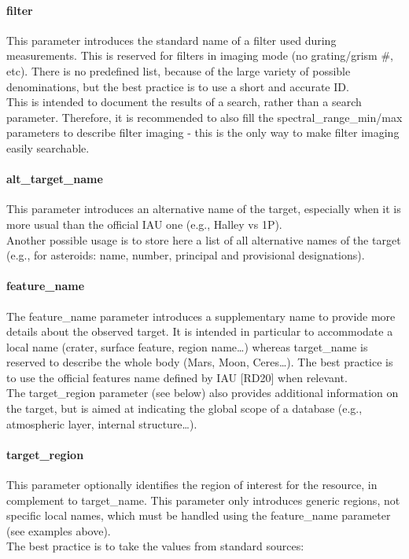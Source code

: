 \documentclass[11pt,a4paper]{ivoa}
\begin{document}
\paragraph{filter}

This parameter introduces the standard name of a filter used during measurements. This is reserved for filters in imaging mode (no grating/grism \#, etc). There is no predefined list, because of the large variety of possible denominations, but the best practice is to use a short and accurate ID.\\This is intended to document the results of a search, rather than a search parameter. Therefore, it is recommended to also fill the spectral\_range\_min/max parameters to describe filter imaging - this is the only way to make filter imaging easily searchable.

\paragraph{alt\_target\_name}

This parameter introduces an alternative name of the target, especially when it is more usual than the official IAU one (e.g., Halley vs 1P).\\Another possible usage is to store here a list of all alternative names of the target (e.g., for asteroids: name, number, principal and provisional designations).

\paragraph{feature\_name}

The feature\_name parameter introduces a supplementary name to provide more details about the observed target. It is intended in particular to accommodate a local name (crater, surface feature, region name…) whereas target\_name is reserved to describe the whole body (Mars, Moon, Ceres…). The best practice is to use the official features name defined by IAU [RD20] when relevant.\\ The target\_region parameter (see below) also provides additional information on the target, but is aimed at indicating the global scope of a database (e.g., atmospheric layer, internal structure…).

\paragraph{target\_region}

This parameter optionally identifies the region of interest for the resource, in complement to target\_name. This parameter only introduces generic regions, not specific local names, which must be handled using the feature\_name parameter (see examples above).\\ The best practice is to take the values from standard sources:
\end{document}
